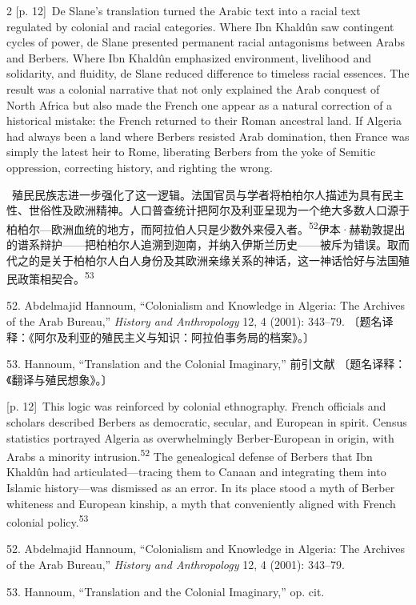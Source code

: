 \documentclass[10pt,a4paper]{article}
\begin{document}
\begin{paracol}{2}
{\scriptsize\color{gray} [p. 12]}\ De Slane’s translation turned the Arabic text into a racial text regulated by colonial and racial categories. Where Ibn Khaldûn saw contingent cycles of power, de Slane presented permanent racial antagonisms between Arabs and Berbers. Where Ibn Khaldûn emphasized environment, livelihood and solidarity, and fluidity, de Slane reduced difference to timeless racial essences. The result was a colonial narrative that not only explained the Arab conquest of North Africa but also made the French one appear as a natural correction of a historical mistake: the French returned to their Roman ancestral land. If Algeria had always been a land where Berbers resisted Arab domination, then France was simply the latest heir to Rome, liberating Berbers from the yoke of Semitic oppression, correcting history, and righting the wrong.\par
\switchcolumn*
{\scriptsize\color{gray} [p. 12]}\ 殖民民族志进一步强化了这一逻辑。法国官员与学者将柏柏尔人描述为具有民主性、世俗性及欧洲精神。人口普查统计把阿尔及利亚呈现为一个绝大多数人口源于柏柏尔—欧洲血统的地方，而阿拉伯人只是少数外来侵入\mbox{者。\textsuperscript{52}}伊本·赫勒敦提出的谱系辩护——把柏柏尔人追溯到迦南，并纳入伊斯兰历史——被斥为错误。取而代之的是关于柏柏尔人白人身份及其欧洲亲缘关系的神话，这一神话恰好与法国殖民政策相契\mbox{合。\textsuperscript{53}}\par{\small 52. Abdelmajid Hannoum, “Colonialism and Knowledge in Algeria: The Archives of the Arab Bureau,” \textit{History and Anthropology} 12, 4 (2001): 343–79. 〔题名译释：《阿尔及利亚的殖民主义与知识：阿拉伯事务局的档案》。〕\par}{\small 53. Hannoum, “Translation and the Colonial Imaginary,” 前引文献 〔题名译释：《翻译与殖民想象》。〕\par}
\switchcolumn
{\scriptsize\color{gray} [p. 12]}\ This logic was reinforced by colonial ethnography. French officials and scholars described Berbers as democratic, secular, and European in spirit. Census statistics portrayed Algeria as overwhelmingly Berber-European in origin, with Arabs a minority intrusion.\nobreak\textsuperscript{52} The genealogical defense of Berbers that Ibn Khaldûn had articulated—tracing them to Canaan and integrating them into Islamic history—was dismissed as an error. In its place stood a myth of Berber whiteness and European kinship, a myth that conveniently aligned with French colonial policy.\nobreak\textsuperscript{53}\par{\small 52. Abdelmajid Hannoum, “Colonialism and Knowledge in Algeria: The Archives of the Arab Bureau,” \textit{History and Anthropology} 12, 4 (2001): 343–79.\par}{\small 53. Hannoum, “Translation and the Colonial Imaginary,” op. cit.\par}

\end{paracol}
\end{document}
